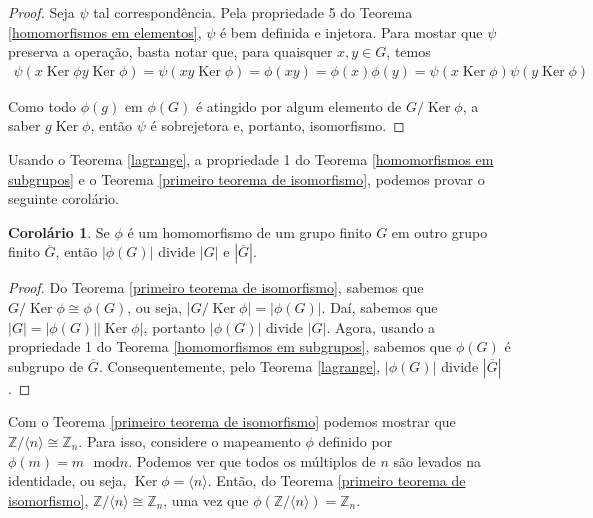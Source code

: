 \documentclass[a4paper,portuguese,11pt,twoside, leqno]{book}
\DeclareMathOperator{\Ker}{Ker}
\theoremstyle{definition}
\newtheorem{corollary}{Corolário}[theorem]
\begin{document}
	\begin{proof}
		Seja $\psi$ tal correspondência. Pela propriedade 5 do Teorema \eqref{homomorfismos em elementos}, $\psi$ é bem definida e injetora. Para mostar que $\psi$ preserva a operação, basta notar que, para quaisquer $x,y\in G$, temos
		\begin{align*}
		\psi(x\Ker\phi y\Ker\phi) = \psi(xy\Ker\phi) = \phi(xy) = \phi(x)\phi(y) = \psi(x\Ker\phi)\psi(y\Ker\phi)
		\end{align*}
		
		\par\vspace{0.3cm} Como todo $\phi(g)$ em $\phi(G)$ é atingido por algum elemento de $G/\Ker\phi$, a saber $g\Ker\phi$, então $\psi$ é sobrejetora e, portanto, isomorfismo.
	\end{proof}
	
	\par\vspace{0.3cm} Usando o Teorema \eqref{lagrange}, a propriedade 1 do Teorema \eqref{homomorfismos em subgrupos} e o Teorema \eqref{primeiro teorema de isomorfismo}, podemos provar o seguinte corolário.
	
	\begin{corollary}
		Se $\phi$ é um homomorfismo de um grupo finito $G$ em outro grupo finito $\overline{G}$, então $|\phi(G)|$ divide $|G|$ e $|\overline{G}|$.
	\end{corollary}
	
	\begin{proof}
		Do Teorema \eqref{primeiro teorema de isomorfismo}, sabemos que $G/\Ker\phi\cong\phi(G)$, ou seja, $|G/\Ker\phi| = |\phi(G)|$. Daí, sabemos que $|G| = |\phi(G)||\Ker\phi|$, portanto $|\phi(G)|$ divide $|G|$. Agora, usando a propriedade 1 do Teorema \eqref{homomorfismos em subgrupos}, sabemos que $\phi(G)$ é subgrupo de $\overline{G}$. Consequentemente, pelo Teorema \eqref{lagrange}, $|\phi(G)|$ divide $|\overline{G}|$.
	\end{proof}
	\par\vspace{0.3cm} Com o Teorema \eqref{primeiro teorema de isomorfismo} podemos mostrar que $\mathbb{Z}/\langle n \rangle\cong \mathbb{Z}_n$. Para isso, considere o mapeamento $\phi$ definido por $\phi(m) = m\text{ }\mathrm{mod} n$. Podemos ver que todos os múltiplos de $n$ são levados na identidade, ou seja, $\Ker\phi = \langle n \rangle$. Então, do Teorema \eqref{primeiro teorema de isomorfismo}, $\mathbb{Z}/\langle n \rangle\cong \mathbb{Z}_n$, uma vez que $\phi(\mathbb{Z}/\langle n \rangle) = \mathbb{Z}_n$.
	
\end{document}
